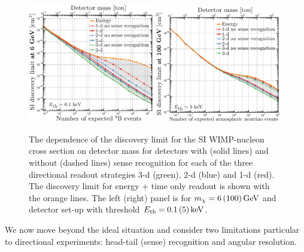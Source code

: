 \begin{figure}
\begin{center}
\includegraphics[trim = 0mm 0mm 0mm 0mm,clip,width=0.49\textwidth,angle=0]{Figures/HeadTail_sig_vs_Exposure_6GeV.eps}
\includegraphics[trim = 0mm 0mm 0mm 0mm,clip,width=0.49\textwidth,angle=0]{Figures/HeadTail_sig_vs_Exposure_100GeV.eps}
\caption[Neutrino floor vs detector mass with no sense recognition]{The dependence of the discovery limit for the SI WIMP-nucleon cross section on detector mass for detectors with (solid lines) and without (dashed lines) sense recognition for each of the three directional readout strategies 3-d (green), 2-d (blue) and 1-d (red). The discovery limit for energy + time only readout is shown with the orange lines. The left (right) panel is for 
$m_{\chi} = 6 \, (100) \, {\rm GeV} $ and detector set-up with threshold $E_{\rm th} = 0.1 \, (5) \, {\rm keV}$. \label{fig:headtailmass}}
\end{center}
\end{figure}

We now move beyond the ideal situation and consider two limitations particular to directional experiments: head-tail (sense) recognition and angular resolution. 

